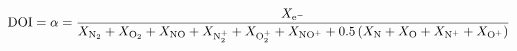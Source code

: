 \documentclass[10pt]{article}
\begin{document}
\begin{align*}{\rm DOI} = \alpha = 
\frac{
X_{\rm e^{-}}
}
{
X_{\rm N_2}+X_{\rm O_2} + X_{\rm NO} + X_{\rm N_2^+}+X_{\rm O_2^+}+X_{\rm NO^+} + 0.5\left( X_{\rm N}+X_{\rm O}+X_{\rm N^+}+X_{\rm O^+}\right)
}\end{align*}
\end{document}
